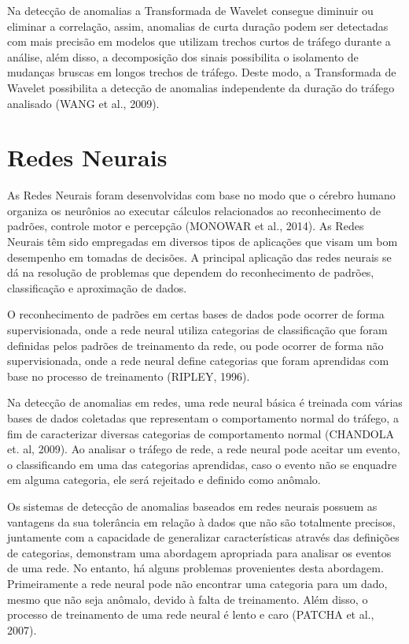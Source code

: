 \indent Na detecção de anomalias a Transformada de Wavelet consegue diminuir ou eliminar a correlação, assim, anomalias de curta duração podem ser detectadas com mais precisão em modelos que utilizam trechos curtos de tráfego durante a análise, além disso, a decomposição dos sinais possibilita o isolamento de mudanças bruscas em longos trechos de tráfego. Deste modo, a Transformada de Wavelet possibilita a detecção de anomalias independente da duração do tráfego analisado (WANG et al., 2009).

  \section{Redes Neurais}
\indent As Redes Neurais foram desenvolvidas com base no modo que o cérebro humano organiza os neurônios ao executar cálculos relacionados ao reconhecimento de padrões, controle motor e percepção (MONOWAR et al., 2014). As Redes Neurais têm sido empregadas em diversos tipos de aplicações que visam um bom desempenho em tomadas de decisões. A principal aplicação das redes neurais se dá na resolução de problemas que dependem do reconhecimento de padrões, classificação e aproximação de dados.

\indent O reconhecimento de padrões em certas bases de dados pode ocorrer de forma supervisionada, onde a rede neural utiliza categorias de classificação que foram definidas pelos padrões de treinamento da rede, ou pode ocorrer de forma não supervisionada, onde a rede neural define categorias que foram aprendidas com base no processo de treinamento (RIPLEY, 1996).

\indent Na detecção de anomalias em redes, uma rede neural básica é treinada com várias bases de dados coletadas que representam o comportamento normal do tráfego, a fim de caracterizar diversas categorias de comportamento normal (CHANDOLA et. al, 2009). Ao analisar o tráfego de rede, a rede neural pode aceitar um evento, o classificando em uma das categorias aprendidas, caso o evento não se enquadre em alguma categoria, ele será rejeitado e definido como anômalo.

\indent Os sistemas de detecção de anomalias baseados em redes neurais possuem as  vantagens da sua tolerância em relação à dados que não são totalmente precisos, juntamente com a capacidade de generalizar características através das definições de categorias, demonstram uma abordagem apropriada para analisar os eventos de uma rede. No entanto, há alguns problemas provenientes desta abordagem. Primeiramente a rede neural pode não encontrar uma categoria para um dado, mesmo que não seja anômalo, devido à falta de treinamento. Além disso, o processo de treinamento de uma rede neural é lento e caro (PATCHA et al., 2007).

